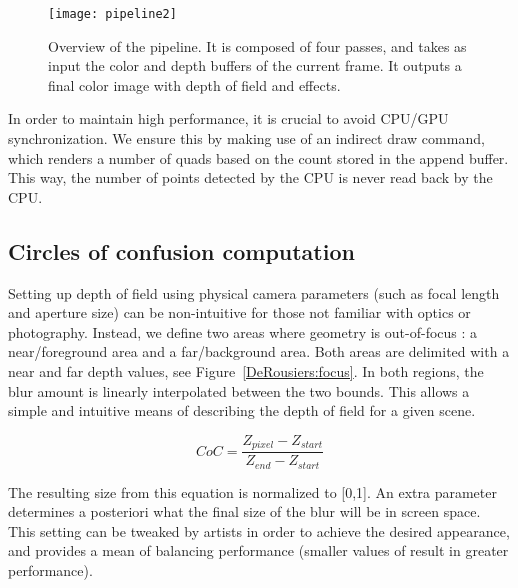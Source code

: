 	\begin{figure}[htb]\centering
	\texttt{[image: pipeline2]}
	\caption{Overview of the pipeline. It is composed of four passes, and takes as input the color and depth buffers of the current frame. It outputs a final color image with depth of field and \bokeh effects.}
	\label{DeRousiers:pipeline}
	\end{figure}

In order to maintain high performance, it is crucial to avoid CPU/GPU synchronization. We ensure this by making use of an indirect draw command, which renders a number of quads based on the count stored in the append buffer. This way, the number of \bokeh points detected by the CPU is never read back by the CPU.

\subsection{Circles of confusion computation}
Setting up depth of field using physical camera parameters (such as focal length and aperture size) can be non-intuitive for those not familiar with optics or photography. Instead, we define two areas where geometry is out-of-focus : a near/foreground area and a far/background area. Both areas are delimited with a near and far depth values, see Figure~\ref{DeRousiers:focus}. In both regions, the blur amount is linearly interpolated between the two bounds. This allows a simple and intuitive means of describing the depth of field for a given scene.

$$
	CoC = \frac{Z_{pixel} - Z_{start} }{ Z_{end} - Z_{start} }
$$

The resulting \coc size from this equation is normalized to [0,1]. An extra parameter  determines a posteriori what the final size of the blur will be in screen space. This setting can be tweaked by artists in order to achieve the desired appearance, and provides a mean of balancing performance (smaller values of  result in greater performance).


